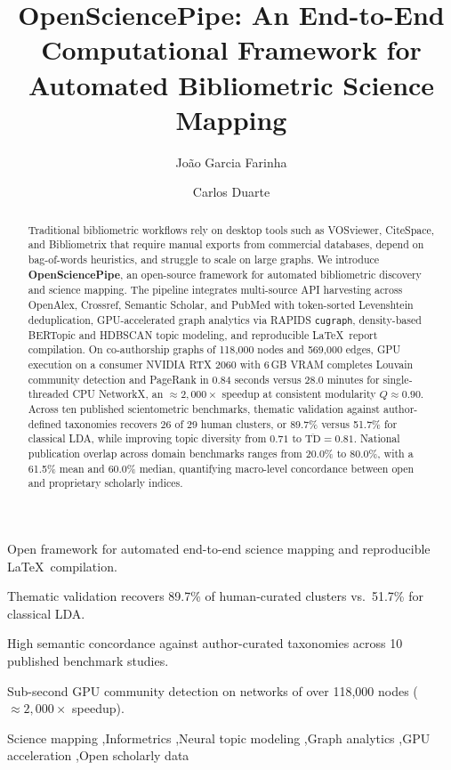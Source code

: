 \documentclass[preprint,12pt]{elsarticle}
\begin{document}
\begin{frontmatter}

  \title{OpenSciencePipe: An End-to-End Computational Framework for Automated Bibliometric Science Mapping}
\author[inst1]{João Garcia Farinha}
\author[inst1]{Carlos Duarte}


\begin{abstract}
Traditional bibliometric workflows rely on desktop tools such as VOSviewer, CiteSpace, and Bibliometrix that require manual exports from commercial databases, depend on bag-of-words heuristics, and struggle to scale on large graphs. We introduce \textbf{OpenSciencePipe}, an open-source framework for automated bibliometric discovery and science mapping. The pipeline integrates multi-source API harvesting across OpenAlex, Crossref, Semantic Scholar, and PubMed with token-sorted Levenshtein deduplication, GPU-accelerated graph analytics via RAPIDS \texttt{cugraph}, density-based BERTopic and HDBSCAN topic modeling, and reproducible \LaTeX\ report compilation. On co-authorship graphs of 118,000 nodes and 569,000 edges, GPU execution on a consumer NVIDIA RTX 2060 with 6\,GB VRAM completes Louvain community detection and PageRank in 0.84 seconds versus 28.0 minutes for single-threaded CPU NetworkX, an $\approx 2{,}000\times$ speedup at consistent modularity $Q \approx 0.90$. Across ten published scientometric benchmarks, thematic validation against author-defined taxonomies recovers 26 of 29 human clusters, or 89.7\% versus 51.7\% for classical LDA, while improving topic diversity from $0.71$ to $\overline{\text{TD}} = 0.81$. National publication overlap across domain benchmarks ranges from 20.0\% to 80.0\%, with a 61.5\% mean and 60.0\% median, quantifying macro-level concordance between open and proprietary scholarly indices.
\end{abstract}
\begin{highlights}
\item Open framework for automated end-to-end science mapping and reproducible \LaTeX\ compilation.
\item Thematic validation recovers 89.7\% of human-curated clusters vs.\ 51.7\% for classical LDA.
\item High semantic concordance against author-curated taxonomies across 10 published benchmark studies.
\item Sub-second GPU community detection on networks of over 118,000 nodes ($\approx 2{,}000\times$ speedup).
\end{highlights}

\begin{keyword}
Science mapping \sep Informetrics \sep Neural topic modeling \sep Graph analytics \sep GPU acceleration \sep Open scholarly data
\end{keyword}

\end{frontmatter}
\end{document}
